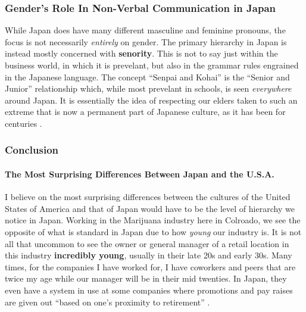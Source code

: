 \documentclass[stu,12pt]{apa7}
\begin{document}
      \subsubsection{Gender's Role In Non-Verbal Communication in Japan}
        While Japan does have many different masculine and feminine pronouns,
          the focus is not necessarily \emph{entirely} on gender. The primary
          hierarchy in Japan is instead mostly concerned with \textbf{senority}.
          This is not to say just within the business world, in which it is
          prevelant, but also in the grammar rules engrained in the Japanese
          language. The concept ``Senpai and Kohai'' is the
          ``Senior and Junior'' relationship which, while most prevelant in
          schools, is seen \textit{everywhere} around Japan. It is essentially
          the idea of respecting our elders taken to such an extreme that is
          now a permanent part of Japanese culture, as it has been for centuries
          \parencite[pp. 253]{potts_japanese_nodate}.
      \subsubsection{Conclusion}
        \paragraph{The Most Surprising Differences Between Japan and the U.S.A.}
          I believe on the most surprising differences between the cultures of
            the United States of America and that of Japan would have to be
            the level of hierarchy we notice in Japan. Working in the Marijuana
            industry here in Colroado, we see the opposite of what is standard
            in Japan due to how \textit{young} our industry is. It is not
            all that uncommon to see the owner or general manager of a retail
            location in this industry \textbf{incredibly young}, usually in
            their late 20s and early 30s. Many times, for the companies I have
            worked for, I have coworkers and peers that are twice my age while
            our manager will be in their mid twenties. In Japan, they even have
            a system in use at some companies where promotions and pay raises
            are given out ``based on one's proximity to retirement''
            \parencite{lafrance_cultural_1978}.
\end{document}
